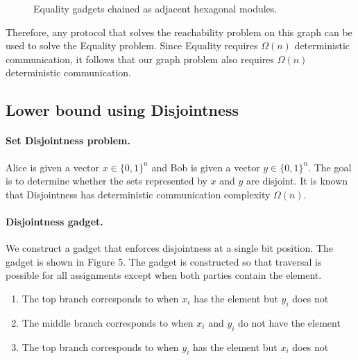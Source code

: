 \documentclass{article}
\begin{document}
\begin{figure}[h]
\centering
{}

\caption{Equality gadgets chained as adjacent hexagonal modules.}
\end{figure}

Therefore, any protocol that solves the reachability problem on this graph can be used to solve the Equality problem. Since Equality requires $\Omega(n)$ deterministic communication, it follows that our graph problem also requires $\Omega(n)$ deterministic communication.

\newpage

\subsection*{Lower bound using Disjointness}

\paragraph{Set Disjointness problem.}
Alice is given a vector 
$x \in \{0,1\}^n$ and Bob is given a vector $y \in \{0,1\}^n$. 
The goal is to determine whether the sets represented by $x$ and $y$ are disjoint. It is known that Disjointness has deterministic communication complexity $\Omega(n)$.

\paragraph{Disjointness gadget.}
We construct a gadget that enforces disjointness at a single bit position. The gadget is shown in Figure 5. The gadget is constructed so that traversal is possible for all assignments except when both parties contain the element.

\begin{enumerate}
    \item The top branch corresponds to when $x_i$ has the element but $y_i$ does not
    \item The middle branch corresponds to when $x_i$ and $y_i$ do not have the element
    \item The top branch corresponds to when $y_i$ has the element but $x_i$ does not
\end{enumerate}
\end{document}
